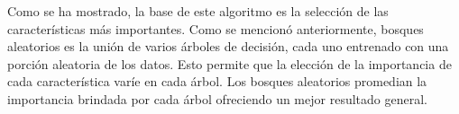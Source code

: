 Como se ha mostrado, la base de este algoritmo es la selección de las  características más importantes. Como se mencionó anteriormente, bosques aleatorios es la unión de varios árboles de decisión, cada uno entrenado con una porción aleatoria de los datos. Esto permite que la elección de la importancia de cada característica varíe en cada árbol. Los bosques aleatorios promedian la importancia brindada por cada árbol ofreciendo un mejor resultado general.